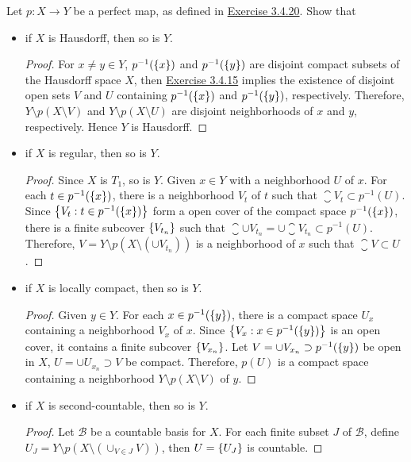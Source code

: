 \documentclass[12pt,a4paper]{article}
\begin{document}
    \begin{ex}
        Let $p:X\to Y$ be a perfect map, as defined in \hyperref[3.4.20]{Exercise 3.4.20}. Show that
        \begin{itemize}
            \item if $X$ is Hausdorff, then so is $Y$.
            \begin{proof}
                For $x\neq y\in Y$, $p^{-1}(\left\{x\right\})$ and $p^{-1}(\left\{y\right\})$ are disjoint compact subsets of the Hausdorff space $X$, then \hyperref[3.4.15]{Exercise 3.4.15} implies the existence of disjoint open sets $V$ and $U$ containing $p^{-1}(\left\{x\right\})$ and $p^{-1}(\left\{y\right\})$, respectively. Therefore, $Y\setminus p(X\setminus V)$ and $Y\setminus p(X\setminus U)$ are disjoint neighborhoods of $x$ and $y$, respectively. Hence $Y$ is Hausdorff. 
            \end{proof}
            \item if $X$ is regular, then so is $Y$.
            \begin{proof}
                Since $X$ is $T_1$, so is $Y$. Given $x\in Y$ with a neighborhood $U$ of $x$. For each $t\in p^{-1}(\left\{x\right\})$, there is a neighborhood $V_t$ of $t$ such that $\closure{V_t}\subset p^{-1}(U)$. Since $\left\{V_t:t\in p^{-1}(\left\{x\right\})\right\}$ form a open cover of the compact space $p^{-1}(\left\{x\right\})$, there is a finite subcover $\left\{V_{t_n}\right\}$ such that $\closure{\cup V_{t_n}}=\cup\closure{V_{t_n}}\subset p^{-1}(U)$. Therefore, $V=Y\setminus p(X\setminus(\cup V_{t_n}))$ is a neighborhood of $x$ such that $\closure{V}\subset U$.
            \end{proof}
            \item if $X$ is locally compact, then so is $Y$.
            \begin{proof}
                Given $y\in Y$. For each $x\in p^{-1}(\left\{y\right\})$, there is a compact space $U_x$ containing a neighborhood $V_x$ of $x$. Since $\left\{V_x:x\in p^{-1}(\left\{y\right\})\right\}$ is an open cover, it contains a finite subcover $\left\{V_{x_n}\right\}$. Let $V=\cup V_{x_n}\supset p^{-1}(\left\{y\right\})$ be open in $X$, $U=\cup U_{x_n}\supset V$ be compact. Therefore, $p(U)$ is a compact space containing a neighborhood $Y\setminus p(X\setminus V)$ of $y$.
            \end{proof}
            \item if $X$ is second-countable, then so is $Y$.
            \begin{proof}
                Let $\mathcal{B}$ be a countable basis for $X$. For each finite subset $J$ of $\mathcal{B}$, define $U_J=Y\setminus p(X\setminus(\cup_{V\in J}V))$, then $U=\left\{U_J\right\}$ is countable.
                

\end{proof}
\end{itemize}
\end{ex}
\end{document}
